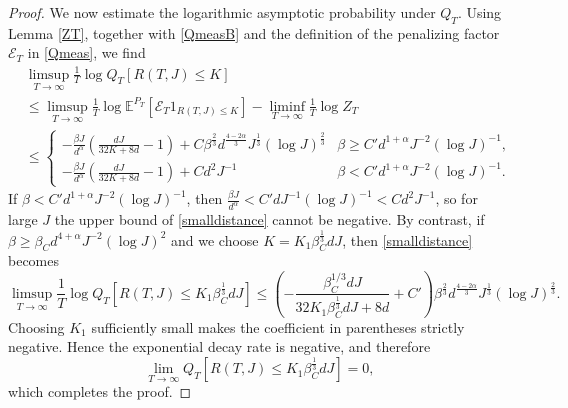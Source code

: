 \documentclass[12pt]{amsart}
\numberwithin{equation}{section}
\newcommand{\E}{\mathbb{E}}
\newcommand{\1}{\mathbf{1}}
\begin{document}
\begin{proof}
We now estimate the logarithmic asymptotic probability under $Q_T$. Using Lemma \ref{ZT}, together with \eqref{QmeasB} and the definition of the penalizing factor $\mathcal{E}_T$ in \eqref{Qmeas}, we find
\begin{equation}
\label{smalldistance}
\begin{split}
    &\limsup_{T\to \infty}\frac{1}{T}\log Q_T\left[R(T,J)\leq K\right]\\
    &\leq\limsup_{T\to \infty}\frac{1}{T}\log \E^{P_T}\left[\mathcal{E}_T1_{R(T,J)\leq K}\right]-\liminf_{T\to\infty}\frac{1}{T}\log Z_T\\
    &\leq\begin{cases}
            -\frac{\beta J}{d^{\alpha}}\left(\frac{d J}{32K+8d}-1\right)+C\beta^{\frac{2}{3}}d^{\frac{4-2\alpha}{3}}J^{\frac{1}{3}}(\log J)^{\frac{2}{3}} & \beta\geq C'd^{1+\alpha}J^{-2}(\log J)^{-1},\\
            -\frac{\beta J}{d^{\alpha}}\left(\frac{d J}{32K+8d}-1\right)+Cd^2J^{-1}&\beta<C'd^{1+\alpha}J^{-2}(\log J)^{-1}.\end{cases}
    \end{split}
\end{equation}
If $\beta<C'd^{1+\alpha}J^{-2}(\log J)^{-1}$, then $\frac{\beta J}{d^\alpha}<C'd J^{-1}(\log J)^{-1}<Cd^2J^{-1}$, so for large $J$ the upper bound of \eqref{smalldistance} cannot be negative. By contrast, if $\beta \geq\beta_Cd^{4+\alpha}J^{-2}(\log J)^{2}$ and we choose $K=K_1\beta_C^{\frac{1}{3}}d J$, then \eqref{smalldistance} becomes
\begin{equation*}
    \limsup_{T\to \infty}\frac{1}{T}\log Q_T\left[R(T,J)\leq K_1\beta_C^{\frac{1}{3}}d J\right]\leq \left(-\frac{\beta_C^{1/3}d J}{32K_1\beta_C^{\frac{1}{3}}d J+8d}+C'\right)\beta^{\frac{2}{3}}d^{\frac{4-2\alpha}{3}}J^{\frac{1}{3}}(\log J)^{\frac{2}{3}}.
\end{equation*}
Choosing $K_1$ sufficiently small makes the coefficient in parentheses strictly negative. Hence the exponential decay rate is negative, and therefore
\begin{equation*}
    \lim_{T\to \infty}Q_T\left[R(T,J)\leq K_1\beta_C^{\frac{1}{3}}d J\right]=0,
\end{equation*}
which completes the proof.
\end{proof}
\end{document}
